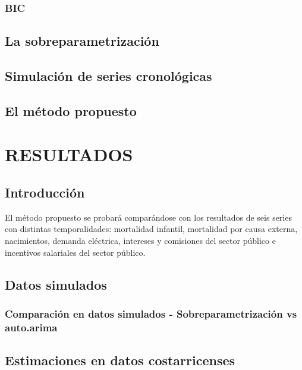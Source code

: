 \documentclass[
]{article}
\begin{document}
\subsubsection{BIC}

\subsection{La sobreparametrización}

\subsection{Simulación de series cronológicas}

\subsection{El método propuesto}

\newpage

\section{RESULTADOS}

\subsection{Introducción}

El método propuesto se probará comparándose con los resultados de seis
series con distintas temporalidades: mortalidad infantil, mortalidad por
causa externa, nacimientos, demanda eléctrica, intereses y comisiones
del sector público e incentivos salariales del sector público.

\subsection{Datos simulados}

\subsubsection{Comparación en datos simulados - Sobreparametrización vs auto.arima}

\subsection{Estimaciones en datos costarricenses}
\end{document}
